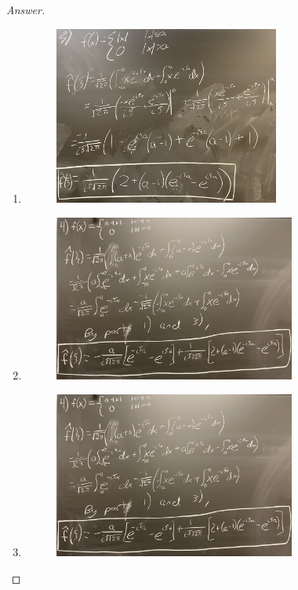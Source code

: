 \documentclass{article}
\theoremstyle{definition}
\renewcommand\qedsymbol{$\blacksquare$}
\newenvironment{ans}{\begin{proof}[Answer]\renewcommand{\qedsymbol}{}}{\end{proof}}
\begin{document}
\begin{ans}
\begin{enumerate}
        \item \phantom{.}
        \begin{figure}[H]
            \centering
            \includegraphics[width = 0.7\textwidth]{Problem 5 Part 3.jpeg}
        \end{figure}

        \item \phantom{.}
        \begin{figure}[H]
            \centering
            \includegraphics[width = 0.75\textwidth]{Problem 5 Part 4.jpeg}
        \end{figure}

        \item \phantom{.}
        \begin{figure}[H]
            \centering
            \includegraphics[width = 0.75\textwidth]{Problem 5 Part 4.jpeg}
        \end{figure}


\end{enumerate}
\end{ans}
\end{document}

